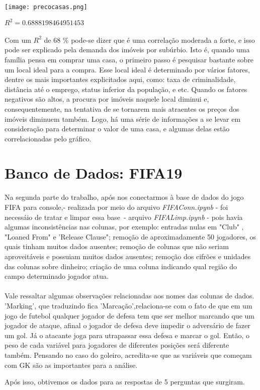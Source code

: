 \documentclass[12pt]{article}
\begin{document}
\texttt{[image: precocasas.png]}

$R^2 = 0.6888198464951453$
\\
\\
Com um $R^2$ de 68 \% pode-se dizer que é uma correlação moderada a forte, e isso pode ser explicado pela demanda dos imóveis por subúrbio. Isto é, quando uma família pensa em comprar uma casa, o primeiro passo é pesquisar bastante sobre um local ideal para a compra. Esse local ideal é determinado por  vários fatores, dentre os mais importantes explicitados aqui, como: taxa de criminalidade, distância até o emprego, status inferior da população, e etc. Quando os fatores negativos são altos, a procura por imóveis naquele local diminui e, consequentemente, na tentativa de se tornarem mais atraentes os preços dos imóveis diminuem também. Logo, há uma série de informações a se levar em consideração para determinar o valor de uma casa, e algumas delas estão correlacionadas pelo gráfico.

\section{Banco de Dados: FIFA19}
Na segunda parte do trabalho, após nos conectarmos à base de dados do jogo FIFA para console,- realizada por meio do arquivo \emph{FIFAConn.ipynb} -  foi necessáio de tratar e limpar essa base\ - arquivo \emph{FIFALimp.ipynb} - pois havia algumas inconsistências nas colunas, por exemplo: entradas nulas em "Club" , "Loaned From" e 'Release Clause"; remoção de aproximadamente 50 jogadores, os quais tinham muitos dados ausentes; remoção de colunas que não seriam aproveitáveis e possuiam muitos dados ausentes; remoção dos cifrões e unidades das colunas sobre dinheiro; criação de uma coluna indicando qual região do campo determinado jogador atua.\\
\\
Vale ressaltar algumas observações relacionadas aos nomes das colunas de dados. 'Marking', que traduzindo fica 'Marcação',relaciona-se com o fato de que em um jogo de futebol qualquer jogador de defesa tem que ser melhor marcando que um jogador de ataque, afinal o jogador de defesa deve impedir o adversário de fazer um gol. Já o atacante joga para utrapassar essa defesa e marcar o gol. Então, o peso de cada variável para jogadores de diferentes posições será diferente também. Pensando no caso do goleiro, acredita-se que as variáveis que começam com GK são as importantes para a análise.


Após isso, obtivemos os dados para as respostas de 5 perguntas que surgiram.
\end{document}
